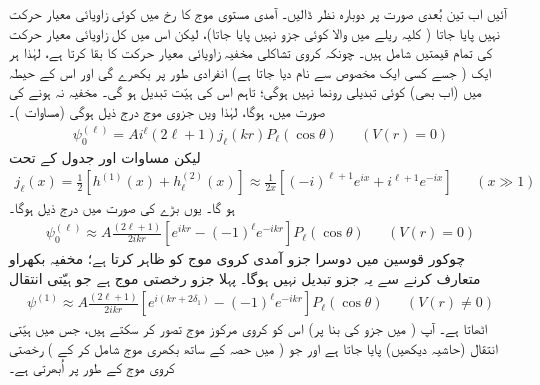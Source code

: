 آئیں اب تین بُعدی صورت پر دوبارہ نظر  ڈالیں۔ آمدی مستوی موج  کا  رخ میں کوئی زاویائی معیار حرکت نہیں پایا جاتا ( کلیہ ریلے میں  والا کوئی جزو نہیں پایا جاتا)، لیکن  اس میں کل زاویائی معیار حرکت  کی تمام قیمتیں شامل ہیں۔ چونکہ  کروی تشاکلی مخفیہ  زاویائی معیار حرکت کا  بقا کرتا ہے،  لہٰذا ہر ایک  ( جسے کسی ایک مخصوص   سے نام دیا جاتا ہے)  انفرادی طور پر بکھرے گی اور اس کے حیطہ  میں (اب بھی)  کوئی تبدیلی رونما نہیں ہوگی؛  تاہم اس کی  ہیّت تبدیل ہو گی۔ مخفیہ   نہ ہونے کی صورت میں،   ہوگا،  لہٰذا ویں جزوی موج درج ذیل ہوگی (مساوات )۔
\begin{align}
	\psi_0^{(\ell)} = Ai^{\ell}(2\ell+1)j_{\ell}(kr)P_{\ell}(\cos\theta)&&(V(r)=0)
\end{align}
لیکن مساوات   اور  جدول   کے تحت
\begin{align}
	j_{\ell}(x) = \frac{1}{2}\left[h^{(1)}(x)+h_{\ell}^{(2)}(x)\right]\approx\frac{1}{2x}\left[(-i)^{\ell+1}e^{ix}+i^{\ell+1}e^{-ix}\right]&&(x\gg1)
\end{align}
ہو گا۔ یوں بڑے   کی صورت میں درج ذیل ہوگا۔
\begin{align}
	\psi_0^{(\ell)}\approx A\frac{(2\ell+1)}{2ikr}\left[e^{ikr}-(-1)^{\ell}e^{-ikr}\right]P_{\ell}(\cos\theta)&&(V(r)=0)
\end{align}
چوکور قوسین میں دوسرا جزو آمدی کروی موج کو ظاہر کرتا ہے؛  مخفیہ بکھراو متعارف کرنے سے  یہ جزو  تبدیل نہیں ہوگا۔ پہلا جزو رخصتی موج ہے  جو  ہیّتی انتقال  
\begin{align}\label{مساوات_بکھراو_عمومی_روپ}
	\psi^{(1)}\approx A\frac{(2\ell+1)}{2ikr}\left[e^{i(kr+2\delta_1)}-(-1)^{\ell}e^{-ikr}\right]P_{\ell}(\cos\theta)&&(V(r)\neq0)
\end{align}
 اٹھاتا ہے۔ آپ  ( میں    جزو کی بنا پر)  اس کو کروی  مرکوز موج تصور کر سکتے ہیں،  جس میں  ہیّتی انتقال (حاشیہ  دیکھیں)  پایا جاتا ہے اور جو  (   میں  حصہ کے ساتھ بکھری موج شامل کر کے )  رخصتی کروی موج کے طور پر اُبھرتی ہے۔

